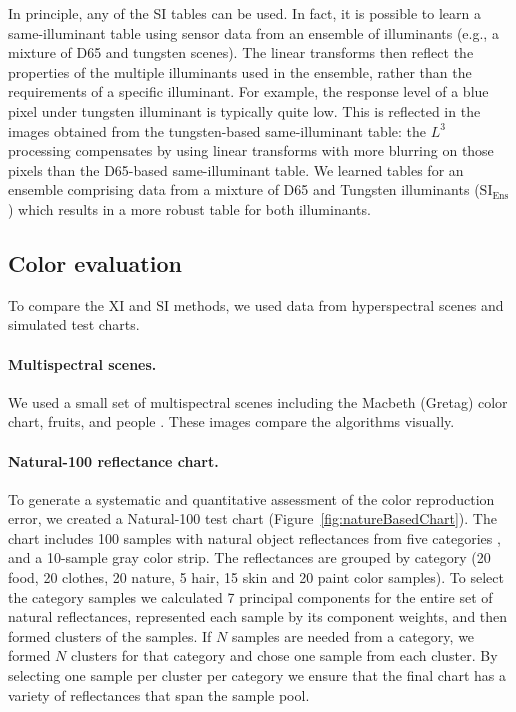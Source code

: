\documentclass[]{spie}
\newcommand{\Lcube}{L^3}
\newcommand{\XI}{\mathrm{XI}}
\newcommand{\SI}{\mathrm{SI}}
\newcommand{\SIE}{\mathrm{SI_{Ens}}}
\begin{document}
In principle, any of the SI tables can be used. In fact, it is possible to learn a same-illuminant table using sensor data from an ensemble of illuminants (e.g., a mixture of D65 and tungsten scenes). The linear transforms then reflect the properties of the multiple illuminants used in the ensemble, rather than the requirements of a specific illuminant. For example, the response level of a blue pixel under tungsten illuminant is typically quite low. This is reflected in the images obtained from the tungsten-based same-illuminant table: the $\Lcube$ processing compensates by using linear transforms with more blurring on those pixels than the D65-based same-illuminant table. We learned tables for an ensemble comprising data from a mixture of D65 and Tungsten illuminants ($\SIE$) which results in a more robust table for both illuminants.

\subsection{Color evaluation} 

To compare the $\XI$ and $\SI$ methods, we used data from hyperspectral scenes and simulated test charts.

\paragraph{Multispectral scenes.} We used a small set of multispectral scenes including the Macbeth (Gretag) color chart, fruits, and people \cite{iset}. These images compare the algorithms visually.

\paragraph{Natural-100 reflectance chart.} To generate a systematic and quantitative assessment of the color reproduction error, we created a Natural-100 test chart (Figure~\ref{fig:natureBasedChart}). The chart includes 100 samples with natural object reflectances from five categories \cite{Vrhel1994}, and a 10-sample gray color strip. The reflectances are grouped by category (20 food, 20 clothes, 20 nature, 5 hair, 15 skin and 20 paint color samples). To select the category samples we calculated 7 principal components for the entire set of natural reflectances, represented each sample by its component weights, and then formed clusters of the samples. If $N$ samples are needed from a category, we formed $N$ clusters for that category and chose one sample from each cluster. By selecting one sample per cluster per category we ensure that the final chart has a variety of reflectances that span the sample pool.
\end{document}
